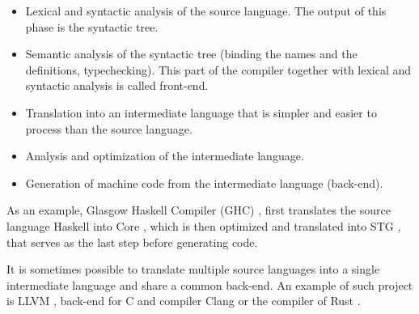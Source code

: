 \begin{itemize}
  \item Lexical and syntactic analysis of the source language. The output of
    this phase is the syntactic tree.
  \item Semantic analysis of the syntactic tree (binding the names and the
    definitions, typechecking). This part of the compiler together with lexical
    and syntactic analysis is called front-end.
  \item Translation into an intermediate language that is simpler and easier to
    process than the source language.
  \item Analysis and optimization of the intermediate language.
  \item Generation of machine code from the intermediate language (back-end).
\end{itemize}

As an example, Glasgow Haskell Compiler (GHC)
\cite{jones1993glasgow,haskellreport2010}, first translates the source language
Haskell into Core \cite{jones1996compiling}, which is then optimized
\cite{jones1997optimiser,santos1995compilation} and translated into STG
\cite{jones1992implementing}, that serves as the last step before generating
code.

It is sometimes possible to translate multiple source languages into a single
intermediate language and share a common back-end. An example of such project is
LLVM \cite{llvm}, back-end for C and \Cplusplus{} compiler Clang \cite{clang} or
the compiler of Rust \cite{rust}.
